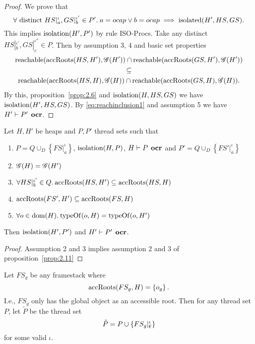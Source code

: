 \begin{proof}
  We prove that 
  \begin{equation*}
    \forall \text{ distinct } HS|_a^\iota, GS|_b^{\iota'} \in P'.\; a = \mbox{$ocap$} \lor b = \mbox{$ocap$} \implies
    \mbox{$\mathrm{isolated}$}(H', HS, GS).
  \end{equation*}
  This implies $\mbox{$\mathrm{isolation}$}(H', P')$ by rule {\sc ISO-Procs}.
  Take any distinct $HS|_b^{\iota'}, GS|_c^{\iota''} \in P$. Then by assumption 3, 4 and basic set
  properties
  \begin{equation} \label{eq:reachinclusion1}
    \begin{gathered}
      \mbox{$\mathrm{reachable}$}(\mbox{$\mathrm{accRoots}$}(HS, H'), \mathscr{G}(H')) \cap \mbox{$\mathrm{reachable}$}(\mbox{$\mathrm{accRoots}$}(GS, H'),
      \mathscr{G}(H')) \\
      \subseteq \\
      \mbox{$\mathrm{reachable}$}(\mbox{$\mathrm{accRoots}$}(HS, H), \mathscr{G}(H)) \cap \mbox{$\mathrm{reachable}$}(\mbox{$\mathrm{accRoots}$}(GS, H),
      \mathscr{G}(H)).
    \end{gathered}
  \end{equation}
  By this, proposition~\ref{prop:2.6} and $\mbox{$\mathrm{isolation}$}(H, HS, GS)$ we have
  $\mbox{$\mathrm{isolation}$}(H', HS, GS)$. By \eqref{eq:reachinclusion1} and assumption 5
  we have $H' \vdash P' \:\: \mbox{\bf ocr}$.
\end{proof}

\begin{corollary} \label{cor:2.11}
  Let $H, H'$ be heaps and $P, P'$ thread sets such that
  \begin{enumerate}
    \item $P = Q \cup_D \left\{ FS|_a^\iota \right\}$, $\mbox{$\mathrm{isolation}$}{(H, P)}$, $H
      \vdash P \:\: \mbox{\bf ocr}$ and $P' = Q \cup_D \left\{ FS'|_a^\iota \right\}$
    \item $\mathscr{G}{(H)} = \mathscr{G}{(H')}$
    \item $\forall HS|_b^{\iota'} \in Q. \: \mbox{$\mathrm{accRoots}$}{(HS, H')} \subseteq \mbox{$\mathrm{accRoots}$}{(HS, H)}$
    \item $\mbox{$\mathrm{accRoots}$}{(FS', H')} \subseteq \mbox{$\mathrm{accRoots}$}{(FS, H)}$
    \item $\forall o \in \mbox{$\mathrm{dom}$}{(H)}. \: \mbox{$\mathrm{typeOf}$}{(o, H)} = \mbox{$\mathrm{typeOf}$}{(o, H')}$
  \end{enumerate}
  Then $\mbox{$\mathrm{isolation}$}{(H', P')}$ and $H' \vdash P' \:\: \mbox{\bf ocr}$.
\end{corollary}

\begin{proof}
  Assumption 2 and 3 implies assumption 2 and 3 of
  proposition~\ref{prop:2.11}
\end{proof}

\begin{definition} \label{def:ptilde}
  Let $FS_g$ be any framestack where 
  \begin{equation*}
    \mbox{$\mathrm{accRoots}$}(FS_g, H) = \left\{ o_g \right\}.
  \end{equation*}
  I.e., $FS_g$ only has the global object as an accessible root.  Then for
  any thread set $P$, let $\tilde{P}$ be the thread set
  \begin{equation*}
    \tilde{P} = P \cup \left\{ FS_g|_{\mbox{$\epsilon$}}^\iota \right\}
  \end{equation*}
  for some valid $\iota$.
\end{definition}

